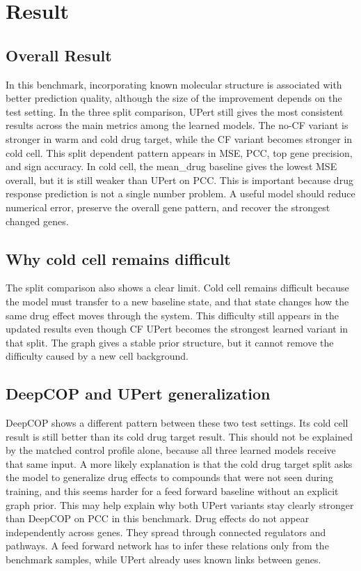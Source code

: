 \section{Result}
\subsection{Overall Result}
\noindent In this benchmark, incorporating known molecular structure is associated with better prediction quality, although the size of the improvement depends on the test setting. In the three split comparison, UPert still gives the most consistent results across the main metrics among the learned models. The no-CF variant is stronger in warm and cold drug target, while the CF variant becomes stronger in cold cell. This split dependent pattern appears in MSE, PCC, top gene precision, and sign accuracy. In cold cell, the mean\_drug baseline gives the lowest MSE overall, but it is still weaker than UPert on PCC. This is important because drug response prediction is not a single number problem. A useful model should reduce numerical error, preserve the overall gene pattern, and recover the strongest changed genes.

\subsection{Why cold cell remains difficult}
\noindent The split comparison also shows a clear limit. Cold cell remains difficult because the model must transfer to a new baseline state, and that state changes how the same drug effect moves through the system. This difficulty still appears in the updated results even though CF UPert becomes the strongest learned variant in that split. The graph gives a stable prior structure, but it cannot remove the difficulty caused by a new cell background.

\subsection{DeepCOP and UPert generalization}
\noindent DeepCOP shows a different pattern between these two test settings. Its cold cell result is still better than its cold drug target result. This should not be explained by the matched control profile alone, because all three learned models receive that same input. A more likely explanation is that the cold drug target split asks the model to generalize drug effects to compounds that were not seen during training, and this seems harder for a feed forward baseline without an explicit graph prior. This may help explain why both UPert variants stay clearly stronger than DeepCOP on PCC in this benchmark. Drug effects do not appear independently across genes. They spread through connected regulators and pathways. A feed forward network has to infer these relations only from the benchmark samples, while UPert already uses known links between genes.

